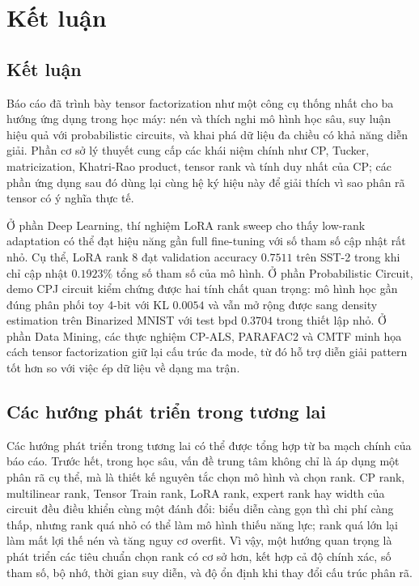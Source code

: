 \section{Kết luận}

\subsection{Kết luận}

Báo cáo đã trình bày tensor factorization như một công cụ thống nhất cho ba
hướng ứng dụng trong học máy: nén và thích nghi mô hình học sâu, suy luận hiệu
quả với probabilistic circuits, và khai phá dữ liệu đa chiều có khả năng diễn
giải. Phần cơ sở lý thuyết cung cấp các khái niệm chính như CP, Tucker,
matricization, Khatri-Rao product, tensor rank và tính duy nhất của CP; các phần
ứng dụng sau đó dùng lại cùng hệ ký hiệu này để giải thích vì sao phân rã tensor
có ý nghĩa thực tế.

Ở phần Deep Learning, thí nghiệm LoRA rank sweep cho thấy low-rank adaptation có
thể đạt hiệu năng gần full fine-tuning với số tham số cập nhật rất nhỏ. Cụ thể,
LoRA rank 8 đạt validation accuracy $0.7511$ trên SST-2 trong khi chỉ cập nhật
$0.1923\%$ tổng số tham số của mô hình. Ở phần Probabilistic Circuit, demo CPJ
circuit kiểm chứng được hai tính chất quan trọng: mô hình học gần đúng phân phối
toy 4-bit với KL $0.0054$ và vẫn mở rộng được sang density estimation trên
Binarized MNIST với test bpd $0.3704$ trong thiết lập nhỏ. Ở phần Data Mining,
các thực nghiệm CP-ALS, PARAFAC2 và CMTF minh họa cách tensor factorization giữ
lại cấu trúc đa mode, từ đó hỗ trợ diễn giải pattern tốt hơn so với việc ép dữ
liệu về dạng ma trận.

\subsection{Các hướng phát triển trong tương lai}

Các hướng phát triển trong tương lai có thể được tổng hợp từ ba mạch chính của
báo cáo. Trước hết, trong học sâu, vấn đề trung tâm không chỉ là áp dụng một phân
rã cụ thể, mà là thiết kế nguyên tắc chọn mô hình và chọn rank. CP rank,
multilinear rank, Tensor Train rank, LoRA rank, expert rank hay width của circuit
đều điều khiển cùng một đánh đổi: biểu diễn càng gọn thì chi phí càng thấp, nhưng
rank quá nhỏ có thể làm mô hình thiếu năng lực; rank quá lớn lại làm mất lợi thế
nén và tăng nguy cơ overfit. Vì vậy, một hướng quan trọng là phát triển các tiêu
chuẩn chọn rank có cơ sở hơn, kết hợp cả độ chính xác, số tham số, bộ nhớ, thời
gian suy diễn, và độ ổn định khi thay đổi cấu trúc phân rã.

